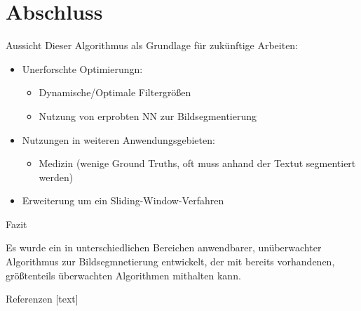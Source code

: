 \documentclass{beamer}
\begin{document}
\section{Abschluss}

\begin{frame}{Aussicht}
Dieser Algorithmus als Grundlage für zukünftige Arbeiten:
\begin{itemize}
	\item Unerforschte Optimierungn:
	\begin{itemize}
		\item Dynamische/Optimale Filtergrößen
		\item Nutzung von erprobten NN zur Bildsegmentierung
	\end{itemize}
	\item Nutzungen in weiteren Anwendungsgebieten:
	\begin{itemize}
		\item Medizin (wenige Ground Truths, oft muss anhand der Textut segmentiert werden)
	\end{itemize}
	\item Erweiterung um ein Sliding-Window-Verfahren
\end{itemize}
\end{frame}

\begin{frame}{Fazit}
	\begin{center}
	Es wurde ein in unterschiedlichen Bereichen anwendbarer, unüberwachter Algorithmus zur Bildsegmnetierung entwickelt, der mit bereits vorhandenen, größtenteils überwachten Algorithmen mithalten kann.
\end{center}
\end{frame}

\begin{frame}[allowframebreaks]{Referenzen}
	[text]
	
	
\end{frame}
\end{document}

